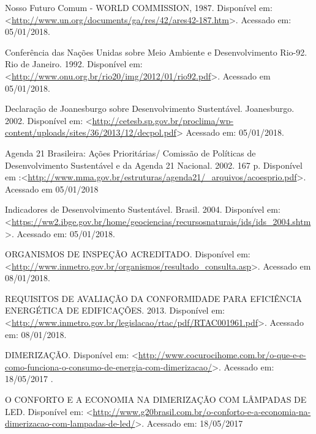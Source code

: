\begin{thebibliography}{3}
{Nosso Futuro Comum - WORLD COMMISSION, 1987. Disponível em: <\url{http://www.un.org/documents/ga/res/42/ares42-187.htm}>. Acessado em: 05/01/2018.}

{Conferência das Nações Unidas sobre Meio Ambiente e Desenvolvimento Rio-92. Rio de Janeiro. 1992. Disponível em: <\url{http://www.onu.org.br/rio20/img/2012/01/rio92.pdf}>. Acessado em 05/01/2018.}

{Declaração de Joanesburgo sobre Desenvolvimento Sustentável. Joanesburgo. 2002. Disponível em: <\url{http://cetesb.sp.gov.br/proclima/wp-content/uploads/sites/36/2013/12/decpol.pdf}> Acessado em: 05/01/2018.}

{Agenda 21 Brasileira: Ações Prioritárias/ Comissão de Políticas de Desenvolvimento Sustentável e da Agenda 21 Nacional. 2002. 167 p. Disponível em :<\url{http://www.mma.gov.br/estruturas/agenda21/_arquivos/acoesprio.pdf}>. Acessado em 05/01/2018}

{Indicadores de Desenvolvimento Sustentável. Brasil. 2004. Disponível em: <\url{https://ww2.ibge.gov.br/home/geociencias/recursosnaturais/ids/ids_2004.shtm}>. Acessado em: 05/01/2018.}

{ORGANISMOS DE INSPEÇÃO ACREDITADO. Disponível em: <\url{http://www.inmetro.gov.br/organismos/resultado_consulta.asp}>. Acessado em 08/01/2018.}

{REQUISITOS DE AVALIAÇÃO DA CONFORMIDADE PARA EFICIÊNCIA ENERGÉTICA DE EDIFICAÇÕES. 2013. Disponível em: <\url{http://www.inmetro.gov.br/legislacao/rtac/pdf/RTAC001961.pdf}>. Acessado em: 08/01/2018.}

{DIMERIZAÇÃO. Disponível em: <\url{http://www.cocurocihome.com.br/o-que-e-e-como-funciona-o-consumo-de-energia-com-dimerizacao/}>. Acessado em: 18/05/2017 .}

{O CONFORTO E A ECONOMIA NA DIMERIZAÇÃO COM LÂMPADAS DE LED. Disponível em: <\url{http://www.g20brasil.com.br/o-conforto-e-a-economia-na-dimerizacao-com-lampadas-de-led/}>. Acessado em: 18/05/2017}


\end{thebibliography}